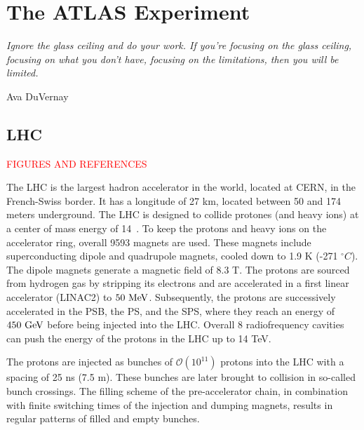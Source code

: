 \chapter{The ATLAS Experiment}
\label{ch:atlas}

\epigraph{\emph{Ignore the glass ceiling and do your work. If you’re focusing on the glass ceiling,  focusing on what you don’t have, focusing on the limitations, then you will be limited.}}{Ava DuVernay}








\section{LHC}
\label{sec:atlas:LHC}
\textcolor{red}{FIGURES AND REFERENCES}

The \ac{LHC} \cite{LHCTDR,LHCMachine} is the largest hadron accelerator in the world, located at \ac{CERN}, in the French-Swiss border. It has a longitude of 27 km, located between 50 and 174 meters underground.
The \ac{LHC} is designed to collide protones (and heavy ions) at a center of mass energy of 14~\tev. To keep the protons and heavy ions on the accelerator ring,  overall 9593 magnets are used. These magnets include superconducting dipole and quadrupole magnets, cooled down to 1.9 K (-271 $^{\circ} C$). The dipole magnets generate a magnetic field of 8.3 T.
The protons are sourced from hydrogen gas by stripping its electrons and are accelerated in a first linear accelerator (LINAC2) to \(50~\text{MeV}\). Subsequently, the protons are successively accelerated in the \ac{PSB}, the \ac{PS}, and the \ac{SPS}, where they reach an energy of \(450~\text{GeV}\) before being injected into the LHC. Overall 8 radiofrequency cavities can push the energy of the protons in the LHC up to 14 TeV.

The protons are injected as bunches of \(\mathcal{O}(10^{11})\) protons into the \ac{LHC} with a spacing of 25 ns (7.5 m). These bunches are later brought to collision in so-called bunch crossings. The filling scheme of the pre-accelerator chain, in combination with finite switching times of the injection and dumping magnets, results in regular patterns of filled and empty bunches.

